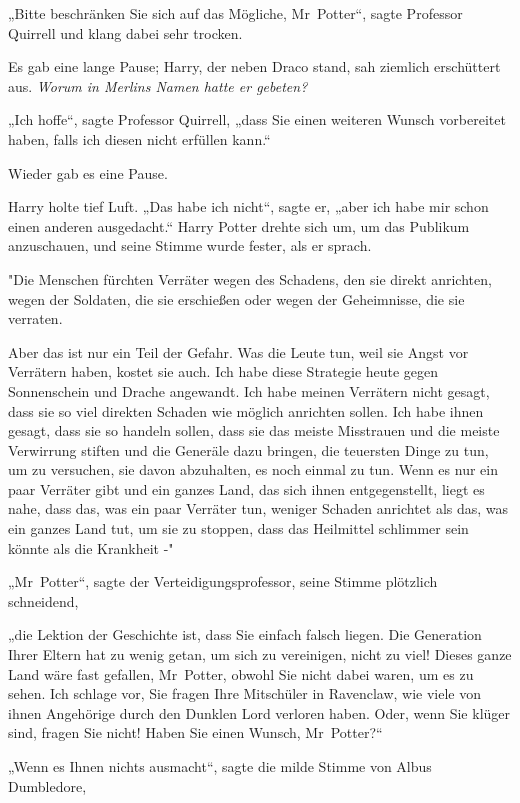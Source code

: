 {„Bitte beschränken Sie sich auf das Mögliche, Mr~Potter“, sagte Professor Quirrell und klang dabei sehr trocken.

Es gab eine lange Pause; Harry, der neben Draco stand, sah ziemlich erschüttert aus. \emph{Worum in Merlins Namen hatte er gebeten?}

„Ich hoffe“, sagte Professor Quirrell, „dass Sie einen weiteren Wunsch vorbereitet haben, falls ich diesen nicht erfüllen kann.“

Wieder gab es eine Pause.

Harry holte tief Luft. „Das habe ich nicht“, sagte er, „aber ich habe mir schon einen anderen ausgedacht.“ Harry Potter drehte sich um, um das Publikum anzuschauen, und seine Stimme wurde fester, als er sprach.

"Die Menschen fürchten Verräter wegen des Schadens, den sie direkt anrichten, wegen der Soldaten, die sie erschießen oder wegen der Geheimnisse, die sie verraten.

Aber das ist nur ein Teil der Gefahr. Was die Leute tun, weil sie Angst vor Verrätern haben, kostet sie auch. Ich habe diese Strategie heute gegen Sonnenschein und Drache angewandt. Ich habe meinen Verrätern nicht gesagt, dass sie so viel direkten Schaden wie möglich anrichten sollen. Ich habe ihnen gesagt, dass sie so handeln sollen, dass sie das meiste Misstrauen und die meiste Verwirrung stiften und die Generäle dazu bringen, die teuersten Dinge zu tun, um zu versuchen, sie davon abzuhalten, es noch einmal zu tun. Wenn es nur ein paar Verräter gibt und ein ganzes Land, das sich ihnen entgegenstellt, liegt es nahe, dass das, was ein paar Verräter tun, weniger Schaden anrichtet als das, was ein ganzes Land tut, um sie zu stoppen, dass das Heilmittel schlimmer sein könnte als die Krankheit -"

„Mr~Potter“, sagte der Verteidigungsprofessor, seine Stimme plötzlich schneidend,

„die Lektion der Geschichte ist, dass Sie einfach falsch liegen. Die Generation Ihrer Eltern hat zu wenig getan, um sich zu vereinigen, nicht zu viel! Dieses ganze Land wäre fast gefallen, Mr~Potter, obwohl Sie nicht dabei waren, um es zu sehen. Ich schlage vor, Sie fragen Ihre Mitschüler in Ravenclaw, wie viele von ihnen Angehörige durch den Dunklen Lord verloren haben. Oder, wenn Sie klüger sind, fragen Sie nicht! Haben Sie einen Wunsch, Mr~Potter?“

„Wenn es Ihnen nichts ausmacht“, sagte die milde Stimme von Albus Dumbledore,

}
